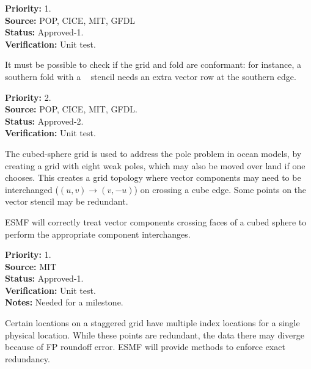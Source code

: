 \begin{reqlist}
{\bf Priority:} 1. \\ 
{\bf Source:} POP, CICE, MIT, GFDL \\
{\bf Status:} Approved-1. \\
{\bf Verification:} Unit test. 
\end{reqlist}


It must be possible to check if the grid and fold are conformant:
for instance, a southern fold with a \bgrid~ stencil needs an extra
vector row at the southern edge.

\begin{reqlist}
{\bf Priority:} 2. \\ 
{\bf Source:} POP, CICE, MIT, GFDL. \\
{\bf Status:} Approved-2. \\
{\bf Verification:} Unit test. 
\end{reqlist}


The cubed-sphere grid \cite{ref:rpm1996} is used to address the pole
problem in ocean models, by creating a grid with eight weak poles,
which may also be moved over land if one chooses. This creates a grid
topology where vector components may need to be interchanged
($(u,v)\longrightarrow(v,-u)$) on crossing a cube edge. Some points on
the vector stencil may be redundant.


ESMF will correctly treat vector components crossing faces of a cubed
sphere to perform the appropriate component interchanges.

\begin{reqlist}
{\bf Priority:} 1. \\ 
{\bf Source:} MIT \\
{\bf Status:} Approved-1. \\
{\bf Verification:} Unit test. \\
{\bf Notes:} Needed for a milestone.
\end{reqlist}


Certain locations on a staggered grid have multiple index locations
for a single physical location. While these points are redundant, the
data there may diverge because of FP roundoff error. ESMF will provide
methods to enforce exact redundancy.

